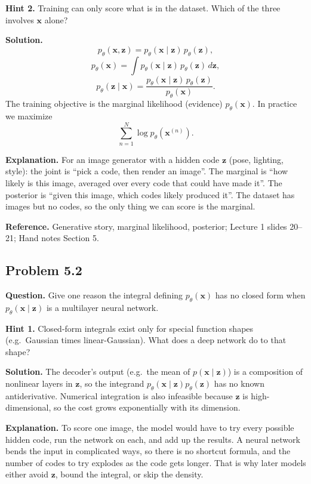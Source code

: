 \documentclass[11pt]{article}
\begin{document}
\textbf{Hint 2.} Training can only score what is in the dataset. Which of the three involves $\mathbf{x}$ alone?

\textbf{Solution.}
\[
p_\theta(\mathbf{x},\mathbf{z}) = p_\theta(\mathbf{x}\mid\mathbf{z})\,p_\theta(\mathbf{z}),
\]
\[
p_\theta(\mathbf{x}) = \int p_\theta(\mathbf{x}\mid\mathbf{z})\,p_\theta(\mathbf{z})\,d\mathbf{z},
\]
\[
p_\theta(\mathbf{z}\mid\mathbf{x}) = \frac{p_\theta(\mathbf{x}\mid\mathbf{z})\,p_\theta(\mathbf{z})}{p_\theta(\mathbf{x})}.
\]
The training objective is the marginal likelihood (evidence) $p_\theta(\mathbf{x})$. In practice we maximize
\[
\sum_{n=1}^{N} \log p_\theta(\mathbf{x}^{(n)}).
\]

\textbf{Explanation.} For an image generator with a hidden code $\mathbf{z}$ (pose, lighting, style): the joint is ``pick a code, then render an image''. The marginal is ``how likely is this image, averaged over every code that could have made it''. The posterior is ``given this image, which codes likely produced it''. The dataset has images but no codes, so the only thing we can score is the marginal.

\textbf{Reference.} Generative story, marginal likelihood, posterior; Lecture 1 slides 20--21; Hand notes Section 5.

\subsection*{Problem 5.2}
\textbf{Question.} Give one reason the integral defining $p_\theta(\mathbf{x})$ has no closed form when $p_\theta(\mathbf{x}\mid\mathbf{z})$ is a multilayer neural network.

\textbf{Hint 1.} Closed-form integrals exist only for special function shapes (e.g.\ Gaussian times linear-Gaussian). What does a deep network do to that shape?

\textbf{Solution.} The decoder's output (e.g.\ the mean of $p(\mathbf{x}\mid\mathbf{z})$) is a composition of nonlinear layers in $\mathbf{z}$, so the integrand $p_\theta(\mathbf{x}\mid\mathbf{z})p_\theta(\mathbf{z})$ has no known antiderivative. Numerical integration is also infeasible because $\mathbf{z}$ is high-dimensional, so the cost grows exponentially with its dimension.

\textbf{Explanation.} To score one image, the model would have to try every possible hidden code, run the network on each, and add up the results. A neural network bends the input in complicated ways, so there is no shortcut formula, and the number of codes to try explodes as the code gets longer. That is why later models either avoid $\mathbf{z}$, bound the integral, or skip the density.
\end{document}
